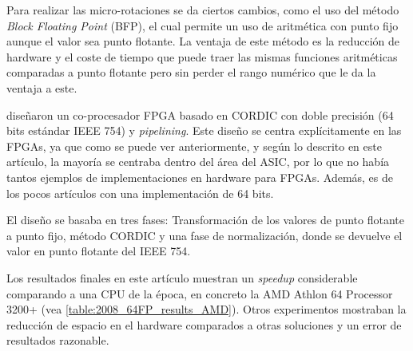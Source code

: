 Para realizar las micro-rotaciones se da ciertos cambios, como el uso del método \textit{Block Floating Point} (BFP), el cual permite un uso de aritmética con punto fijo aunque el valor sea punto flotante. La ventaja de este método es la reducción de hardware y el coste de tiempo que puede traer las mismas funciones aritméticas comparadas a punto flotante pero sin perder el rango numérico que le da la ventaja a este.

\cite{zhou_double_2008} diseñaron un co-procesador FPGA basado en CORDIC con doble precisión (64 bits estándar IEEE 754) y \textit{pipelining}. Este diseño se centra explícitamente en las FPGAs, ya que como se puede ver anteriormente, y según lo descrito en este artículo, la mayoría se centraba dentro del área del ASIC, por lo que no había tantos ejemplos de implementaciones en hardware para FPGAs. Además, es de los pocos artículos con una implementación de 64 bits.

El diseño se basaba en tres fases: Transformación de los valores de punto flotante a punto fijo, método CORDIC y una fase de normalización, donde se devuelve el valor en punto flotante del IEEE 754.

Los resultados finales en este artículo muestran un \textit{speedup} considerable comparando a una CPU de la época, en concreto la AMD Athlon 64 Processor 3200+ (vea \ref{table:2008_64FP_results_AMD}). Otros experimentos mostraban la reducción de espacio en el hardware comparados a otras soluciones y un error de resultados razonable.

\begin{table}[]
	\centering
	\caption{Resultados de 64FP CORDIC y una CPU AMD Athlon 64 Processor 3200+. Num\_C es el número de co-procesadores de CORDIC usados en el experimento.}
	\label{table:2008_64FP_results_AMD}
\end{table}

